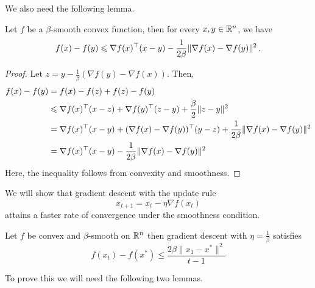 We also need the following lemma.

\begin{lemma} 
Let $f$ be a $\beta$-smooth convex function, then for every $x,y \in \mathbb{R}^n$, we have
$$f(x) - f(y)\leqslant \nabla f(x)^\top(x-y) - 
\frac{1}{2\beta}\|\nabla f(x) - \nabla f(y)\|^2\,.$$
\end{lemma}

\begin{proof}
Let $z = y - \frac{1}{\beta}(\nabla f(y) - \nabla f(x))$.  Then,
\begin{align*}
f(x) - f(y)
    &= f(x) - f(z) + f(z) - f(y) \\
    &\leqslant \nabla f(x)^\top(x-z) + \nabla f(y)^\top(z-y) + \frac{\beta}{2}\|z-y\|^2 \\
    &= \nabla f(x)^\top(x-y) + (\nabla f(x) - \nabla f(y))^\top(y-z) + \frac{1}{2\beta}\|\nabla f(x) - \nabla f(y)\|^2 \\
    &= \nabla f(x)^\top(x-y) - \frac{1}{2\beta} \|\nabla f(x) - \nabla f(y)\|^2
\end{align*}
Here, the inequality follows from convexity and smoothness.
\end{proof}


We will show that gradient descent with the update rule
$$x_{t+1} = x_t - \eta \nabla f(x_t)$$
attains a faster rate of convergence under the smoothness condition.

\begin{theorem}
Let $f$ be convex and $\beta$-smooth on $\mathbb{R}^n$ then gradient descent with $\eta = \frac{1}{\beta}$ satisfies
$$f(x_t) - f(x^*) \leq \frac{2\beta\|x_1 - x^*\|^2}{t-1}$$
\end{theorem}
To prove this we will need the following two lemmas.


